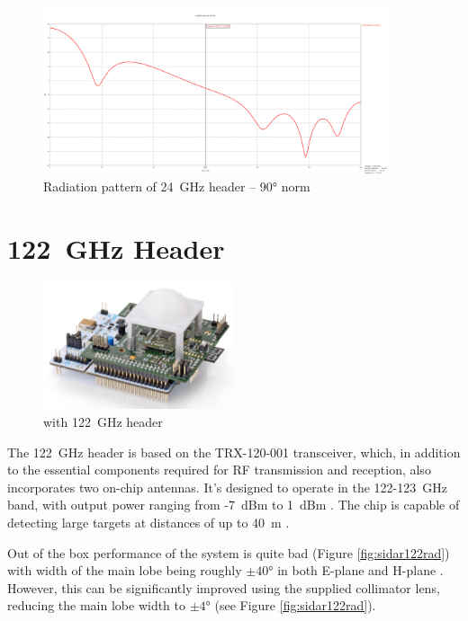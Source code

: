 \begin{figure}[h!]
  \centering
  \includegraphics[width=0.9\textwidth]{../img/farfield90.png}
  \caption[Radiation pattern of 24~GHz header -- 90° norm]{Radiation pattern of 24~GHz header -- 90° norm}
  \label{fig:farfield90}
\end{figure}


\section{122~GHz Header}

\begin{figure}[h!]
  \centering
  \includegraphics[width=0.5\textwidth]{../img/sidar122.png}
  \caption[\sidar with 122~GHz header \cite{sidarPRO}]{\sidar with 122~GHz header}
  \label{fig:sidar122}
\end{figure}

The 122~GHz header is based on the TRX-120-001 transceiver, which, in addition to the essential components required for RF transmission and reception, also incorporates two on-chip antennas.
It's designed to operate in the 122-123~GHz band, with output power ranging from -7~dBm to 1~dBm \cite{sidarTRX122}.
The chip is capable of detecting large targets at distances of up to 40~m \cite{sidarMANOld}.

Out of the box performance of the system is quite bad (Figure \ref{fig:sidar122rad}) with width of the main lobe being roughly $\pm40\text{°}$ in both E-plane and H-plane \cite{sidarTRX122}.
However, this can be significantly improved using the supplied collimator lens, reducing the main lobe width to $\pm4\text{°}$ \cite{sidarTRX122col} (see Figure \ref{fig:sidar122rad}).


